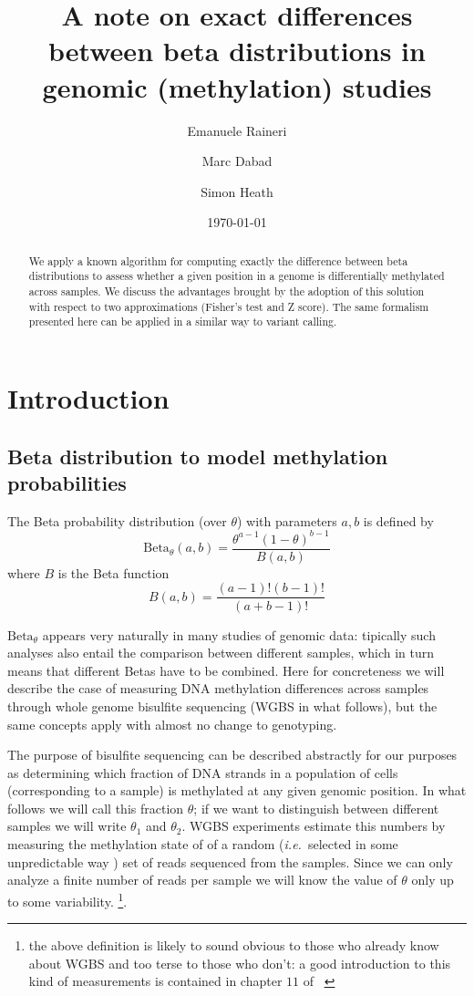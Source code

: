 \documentclass[11pt]{amsart}
\title{A note on exact differences between beta distributions in genomic (methylation) studies}
\author{Emanuele Raineri}
\author{Marc Dabad}
\author{Simon Heath}
\date{\today}
\newcommand{\ie}{\textit{i.e.}\ }
\newcommand{\betapdf}{\mbox{Beta}_\theta}
\begin{document}
\begin{abstract}
We apply a known algorithm for computing exactly the difference between beta distributions
to assess whether a given position in a genome is differentially methylated across
samples. We discuss the advantages brought by the adoption of this solution
with respect to two approximations (Fisher's test and Z score).
The same formalism presented here can be applied in a similar way to variant calling.
\end{abstract}
\maketitle
\section{Introduction}
\subsection{Beta distribution to model methylation probabilities}
The Beta probability distribution (over $\theta$) with parameters $a,b$ is defined by 
\[\betapdf(a,b)=\frac{\theta^{a-1}(1-\theta)^{b-1}}{B(a,b)}\]
where  $B$ is the Beta function 
\[B(a,b)=\frac{(a-1)!(b-1)!}{(a+b-1)!}\]

$\betapdf$ appears very naturally in many studies of genomic data: tipically such analyses also entail the comparison between different samples, which in turn means that different Betas have to be combined. Here for concreteness we will describe the case of measuring DNA methylation differences across samples through whole genome bisulfite sequencing (WGBS in what follows), but the same concepts  apply with almost no change to genotyping. 

The purpose of bisulfite sequencing  can be described abstractly for our purposes as determining which fraction of DNA strands in a population of cells (corresponding to a sample) is methylated at any given genomic position. In what follows we will call this fraction $\theta$; if we want to distinguish between different samples we will write $\theta_1$ and $\theta_2$. WGBS experiments estimate this numbers by measuring the methylation state of of a random (\ie selected in some unpredictable way ) set of reads sequenced from the samples. Since we can only analyze a finite number of reads per sample we will know the value of $\theta$ only up to some variability. 
\footnote{the above definition is likely to sound obvious to those who already know about WGBS and too terse to those who don't: a good introduction to this kind of measurements is contained in chapter $11$ of ~\cite{dna}}.
\end{document}
